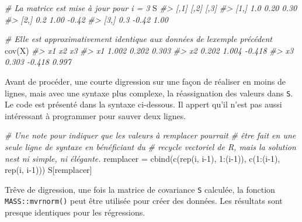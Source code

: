 \documentclass[
]{book}
\newenvironment{Shaded}{}{}
\newcommand{\CommentTok}[1]{\textit{#1}}
\newcommand{\DecValTok}[1]{#1}
\newcommand{\FunctionTok}[1]{#1}
\newcommand{\NormalTok}[1]{#1}
\newcommand{\OtherTok}[1]{#1}
\newcommand{\SpecialCharTok}[1]{#1}
\begin{document}
\begin{Shaded}
\begin{Highlighting}[]
\CommentTok{\# La matrice est mise à jour pour i = 3}
\NormalTok{S}
\CommentTok{\#\textgreater{}      [,1]  [,2]  [,3]}
\CommentTok{\#\textgreater{} [1,]  1.0  0.20  0.30}
\CommentTok{\#\textgreater{} [2,]  0.2  1.00 {-}0.42}
\CommentTok{\#\textgreater{} [3,]  0.3 {-}0.42  1.00}

\CommentTok{\# Elle est approximativement identique aux données de l\textquotesingle{}exemple précédent}
\FunctionTok{cov}\NormalTok{(X)}
\CommentTok{\#\textgreater{}       x1     x2     x3}
\CommentTok{\#\textgreater{} x1 1.002  0.202  0.303}
\CommentTok{\#\textgreater{} x2 0.202  1.004 {-}0.418}
\CommentTok{\#\textgreater{} x3 0.303 {-}0.418  0.997}
\end{Highlighting}
\end{Shaded}

Avant de procéder, une courte digression sur une façon de réaliser en moins de lignes, mais avec une syntaxe plus complexe, la réassignation des valeurs dans \texttt{S}. Le code est présenté dans la syntaxe ci-dessous. Il appert qu'il n'est pas aussi intéressant à programmer pour sauver deux lignes.

\begin{Shaded}
\begin{Highlighting}[]
\CommentTok{\# Une note pour indiquer que les valeurs à remplacer pourrait}
\CommentTok{\# être fait en une seule ligne de syntaxe en bénéficiant du }
\CommentTok{\# recycle vectoriel de R, mais la solution n\textquotesingle{}est ni simple, ni élégante.}
\NormalTok{remplacer }\OtherTok{=} \FunctionTok{cbind}\NormalTok{(}\FunctionTok{c}\NormalTok{(}\FunctionTok{rep}\NormalTok{(i, i}\DecValTok{{-}1}\NormalTok{), }\DecValTok{1}\SpecialCharTok{:}\NormalTok{(i}\DecValTok{{-}1}\NormalTok{)), }\FunctionTok{c}\NormalTok{(}\DecValTok{1}\SpecialCharTok{:}\NormalTok{(i}\DecValTok{{-}1}\NormalTok{), }\FunctionTok{rep}\NormalTok{(i, i}\DecValTok{{-}1}\NormalTok{)))}
\NormalTok{S[remplacer]}
\end{Highlighting}
\end{Shaded}

Trêve de digression, une fois la matrice de covariance \texttt{S} calculée, la fonction \texttt{MASS::mvrnorm()} peut être utilisée pour créer des données. Les résultats sont presque identiques pour les régressions.
\end{document}
